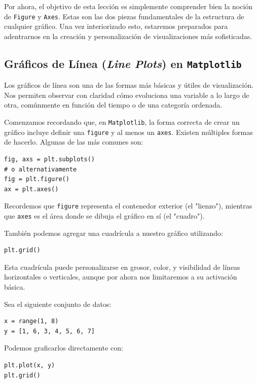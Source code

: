 \documentclass{article}
\theoremstyle{nonumberplain}
\begin{document}
\noindent
Por ahora, el objetivo de esta lección es simplemente comprender bien la noción de \texttt{Figure} y \texttt{Axes}. Estas son las dos piezas fundamentales de la estructura de cualquier gráfico. Una vez interiorizado esto, estaremos preparados para adentrarnos en la creación y personalización de visualizaciones más sofisticadas.

\subsection*{Gráficos de Línea (\textit{Line Plots}) en \texttt{Matplotlib}}

Los gráficos de línea son una de las formas más básicas y útiles de visualización. Nos permiten observar con claridad cómo evoluciona una variable a lo largo de otra, comúnmente en función del tiempo o de una categoría ordenada.

Comenzamos recordando que, en \texttt{Matplotlib}, la forma correcta de crear un gráfico incluye definir una \texttt{figure} y al menos un \texttt{axes}. Existen múltiples formas de hacerlo. Algunas de las más comunes son:

\begin{verbatim}
fig, axs = plt.subplots()
# o alternativamente
fig = plt.figure()
ax = plt.axes()
\end{verbatim}

Recordemos que \texttt{figure} representa el contenedor exterior (el "lienzo"), mientras que \texttt{axes} es el área donde se dibuja el gráfico en sí (el "cuadro").

También podemos agregar una cuadrícula a nuestro gráfico utilizando:

\begin{verbatim}
plt.grid()
\end{verbatim}

Esta cuadrícula puede personalizarse en grosor, color, y visibilidad de líneas horizontales o verticales, aunque por ahora nos limitaremos a su activación básica.

Sea el siguiente conjunto de datos:

\begin{verbatim}
x = range(1, 8)
y = [1, 6, 3, 4, 5, 6, 7]
\end{verbatim}

Podemos graficarlos directamente con:

\begin{verbatim}
plt.plot(x, y)
plt.grid()
\end{verbatim}
\end{document}
